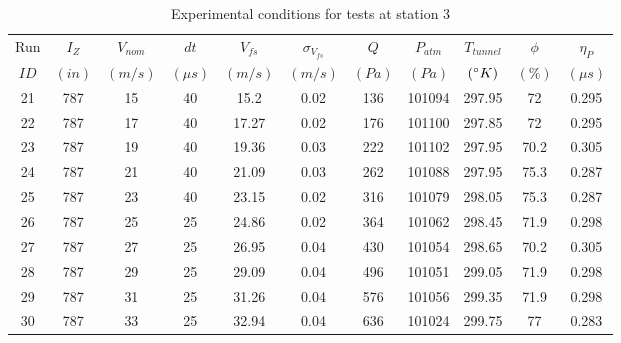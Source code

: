 \begin{table}[H]
\begin{center}
\begin{tabular}{|ccccccccccc|}
	\hline
	Run & $I_Z$ & $V_{nom}$ & $dt$ & $V_{fs}$ & $\sigma_{V_{fs}}$ & $Q$ & $P_{atm}$ & $T_{tunnel}$ & $\phi$ & $\eta_P$\\
	$ID$ & $(in)$ & $(m/s)$ & $(\mu s)$ & $(m/s)$ & $(m/s)$ & $(Pa)$ & $(Pa)$ & $(\degree K)$ & $(\%)$ & $(\mu s)$\\
	\hline
	21 & 787 & 15 & 40 & 15.2 & 0.02 & 136 & 101094 & 297.95 & 72 & 0.295\\
	22 & 787 & 17 & 40 & 17.27 & 0.02 & 176 & 101100 & 297.85 & 72 & 0.295\\
	23 & 787 & 19 & 40 & 19.36 & 0.03 & 222 & 101102 & 297.95 & 70.2 & 0.305\\
	24 & 787 & 21 & 40 & 21.09 & 0.03 & 262 & 101088 & 297.95 & 75.3 & 0.287\\
	25 & 787 & 23 & 40 & 23.15 & 0.02 & 316 & 101079 & 298.05 & 75.3 & 0.287\\
	26 & 787 & 25 & 25 & 24.86 & 0.02 & 364 & 101062 & 298.45 & 71.9 & 0.298\\
	27 & 787 & 27 & 25 & 26.95 & 0.04 & 430 & 101054 & 298.65 & 70.2 & 0.305\\
	28 & 787 & 29 & 25 & 29.09 & 0.04 & 496 & 101051 & 299.05 & 71.9 & 0.298\\
	29 & 787 & 31 & 25 & 31.26 & 0.04 & 576 & 101056 & 299.35 & 71.9 & 0.298\\
	30 & 787 & 33 & 25 & 32.94 & 0.04 & 636 & 101024 & 299.75 & 77 & 0.283\\
	\hline
\end{tabular}
\caption{Experimental conditions for tests at station 3}
\label{table:station_3_measurements}
\end{center}
\end{table}
